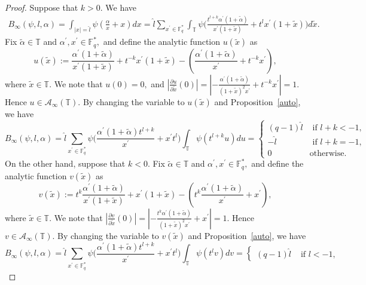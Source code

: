 \documentclass[10pt]{amsart}
\theoremstyle{plain}
\theoremstyle{plain}
\theoremstyle{remark}
\theoremstyle{definition}
\newcommand{\hl}{\widehat l}
\newcommand{\FF}{\mathbb{F}}
\newcommand{\TT}{\mathbb{T}}
\newcommand{\cA}{\mathcal{A}}
\begin{document}
\begin{proof}
Suppose that $k>0$.  We have 
\begin{equation*}
\begin{split}
B_{\infty}(\psi,l,\alpha)=\int_{|x|=\hl} \psi(\frac{\alpha}{ x}+x)dx=\hl \sum_{x^{\prime}\in \FF_q^{*}} \int_{\TT} \psi\Big(\frac{ t^{l+k}\alpha^{\prime} (1+\tilde{\alpha})}{x^{\prime}(1+\tilde{x})} + t^lx^{\prime}(1+\tilde{x}) \Big) d\tilde{x}.
\end{split}
\end{equation*}
Fix $\tilde{\alpha}\in \TT $ and $\alpha^{\prime}, x^{\prime} \in \FF_q^*,$ and define the analytic function $u(\tilde{x})$ as 
\[
u(\tilde{x}):=\frac{ \alpha^{\prime} (1+\tilde{\alpha})}{x^{\prime}(1+\tilde{x})} + t^{-k}x^{\prime}(1+\tilde{x})- \left(  \frac{ \alpha^{\prime} (1+\tilde{\alpha})}{x^{\prime}} + t^{-k}x^{\prime} \right), 
\]
where $\tilde{x}\in\TT.$ We note that $u(0)=0,$ and  $|\frac{\partial u}{\partial \tilde{x}}(0)|=|-\frac{ \alpha^{\prime} (1+\tilde{\alpha})}{(1+\tilde{x})^2x^{\prime}} + t^{-k}x^{\prime}|=1.$ Hence    $u\in \cA_{\infty}(\TT).$
By changing the variable to $u(\tilde{x})$ and Proposition~\ref{auto}, we have 
\[
B_{\infty}(\psi,l,\alpha)=\hl \sum_{x^{\prime}\in \FF_q^{*}}  \psi\Big(\frac{\alpha^{\prime} (1+\tilde{\alpha}) t^{l+k}}{x^{\prime}}+x^{\prime}t^{l} \Big)  \int_{\TT} \psi( t^{l+k}u)du=\begin{cases} 
(q-1)\hl &\text{ if } l+k<-1,
\\
-\hl &\text{ if } l+k=-1,
\\
0   &\text{otherwise.} \end{cases}
\]
On the other hand, suppose that  $k<0$. 
Fix $\tilde{\alpha}\in \TT $ and $\alpha^{\prime}, x^{\prime} \in \FF_q^*,$ and define the analytic function $v(\tilde{x})$ as 
\[
v(\tilde{x}):=t^{k}\frac{ \alpha^{\prime} (1+\tilde{\alpha})}{x^{\prime}(1+\tilde{x})} + x^{\prime}(1+\tilde{x})- \left( t^{k}  \frac{ \alpha^{\prime} (1+\tilde{\alpha})}{x^{\prime}} +x^{\prime} \right), 
\]
where $\tilde{x}\in\TT.$ We note that $|\frac{\partial v}{\partial \tilde{x}}(0)|=|-\frac{ t^{k}\alpha^{\prime} (1+\tilde{\alpha})}{(1+\tilde{x})^2x^{\prime}} + x^{\prime}|=1.$ Hence    $v\in \cA_{\infty}(\TT).$
By changing the variable to $v(\tilde{x})$ and Proposition~\ref{auto}, we have 
\[
B_{\infty}(\psi,l,\alpha)=\hl \sum_{x^{\prime}\in \FF_q^{*}}  \psi\Big(\frac{\alpha^{\prime} (1+\tilde{\alpha}) t^{l+k}}{x^{\prime}}+x^{\prime}t^{l} \Big)  \int_{\TT} \psi( t^{l}v)dv=\begin{cases} 
(q-1)\hl &\text{ if } l<-1,

\end{cases}\]
\end{proof}
\end{document}
